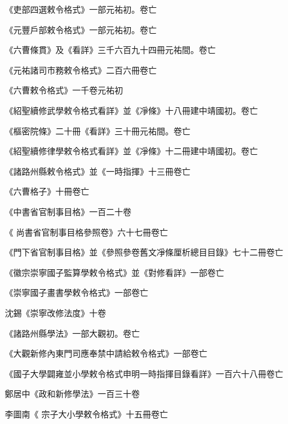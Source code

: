 \begin{pinyinscope}
 《吏部四選敕令格式》一部元祐初。卷亡



 《元豐戶部敕令格式》一部元祐初。卷亡



 《六曹條貫》及《看詳》三千六百九十四冊元祐間。卷亡



 《元祐諸司市務敕令格式》二百六冊卷亡



 《六曹敕令格式》一千卷元祐初



 《紹聖續修武學敕令格式看詳》並《凈條》十八冊建中靖國初。卷亡



 《樞密院條》二十冊《看詳》三十冊元祐間。卷亡



 《紹聖續修律學敕令格式看詳》並《凈條》十二冊建中靖國初。卷亡



 《諸路州縣敕令格式》並《一時指揮》十三冊卷亡



 《六曹格子》十冊卷亡



 《中書省官制事目格》一百二十卷



 《
 尚書省官制事目格參照卷》六十七冊卷亡



 《門下省官制事目格》並《參照參卷舊文凈條厘析總目目錄》七十二冊卷亡



 《徽宗崇寧國子監算學敕令格式》並《對修看詳》一部卷亡



 《崇寧國子畫書學敕令格式》一部卷亡



 沈錫《崇寧改修法度》十卷



 《諸路州縣學法》一部大觀初。卷亡



 《大觀新修內東門司應奉禁中請給敕令格式》一部卷亡



 《國子大學闢雍並小學敕令格式申明一時指揮目錄看詳》一百六十八冊卷亡



 鄭居中《政和新修學法》一百三十卷



 李圖南《
 宗子大小學敕令格式》十五冊卷亡




\end{pinyinscope}
